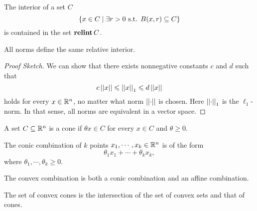 \documentclass[12pt]{article}
\begin{document}
\begin{remark}[Interior]
    The \textnormal{interior} of a set \(C\)
    \[\left\{x\in C\mid\exists r>0\textnormal{ s.t. } B(x,r)\subseteq C\right\}\]
    is contained in the set \(\operatorname{\mathbf{relint}}  C\).
\end{remark}

\begin{proposition}
    All norms define the same relative interior.
\end{proposition}
\begin{proof}[Proof Sketch]
    We can show that there exists nonnegative constants \(c\) and \(d\) such that
    \[c\left|\left|x\right|\right|\leqslant\left|\left|x\right|\right|_1\leqslant d\left|\left|x\right|\right|\]
    holds for every \(x\in\mathbb R^n\), no matter what norm \(\left|\left|\cdot\right|\right|\) is chosen. Here \(\left|\left|\cdot\right|\right|_1\) is the \(\ell_1\)-norm. In that sense, all norms are equivalent in a vector space.
\end{proof}

\begin{definition}[Cone]
    A set \(C\subseteq\mathbb R^n\) is a \textnormal{cone} if \(\theta x\in C\) for every \(x\in C\) and \(\theta\geqslant 0\).
\end{definition}

\begin{definition}
    The \textnormal{conic combination} of \(k\) points \(x_1,\cdots,x_k\in\mathbb R^n\) is of the form
    \[\theta_1x_1+\cdots+\theta_kx_k,\]
    where \(\theta_1,\cdots,\theta_k\geqslant 0\).
\end{definition}

\begin{remark}
    The \textnormal{convex combination} is both a conic combination and an affine combination.
\end{remark}

\begin{definition}
    The set of \textnormal{convex cones} is the intersection of the set of convex sets and that of cones.
\end{definition}
\end{document}
